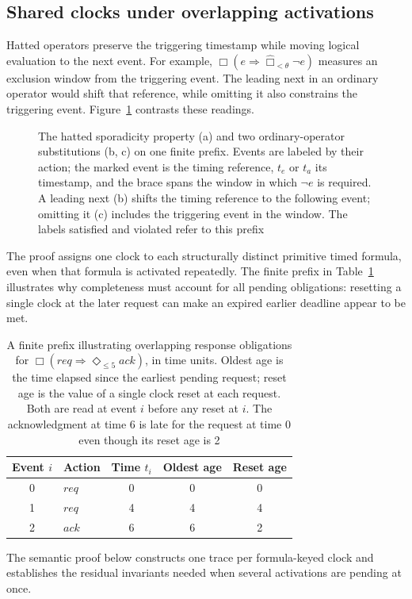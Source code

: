 \documentclass[manuscript]{acmart}
\begin{document}
\subsection{Shared clocks under overlapping activations}
\label{subsec:overlap-motivation}
Hatted operators preserve the triggering timestamp while moving logical
evaluation to the next event. For example,
$\Box(e\Rightarrow\widehat{\Box}_{<\theta}\neg e)$ measures an exclusion
window from the triggering event. The leading next in an ordinary operator
would shift that reference, while omitting it also constrains the triggering
event. Figure~\ref{fig:hat-reference} contrasts these readings.
\begin{figure}[t]
\centering
\resizebox{\textwidth}{!}{}
\caption{The hatted sporadicity property (a) and two ordinary-operator
substitutions (b, c) on one finite prefix. Events are labeled by their action;
the marked event is the timing reference, $t_e$ or $t_a$ its timestamp, and the
brace spans the window in which $\neg e$ is required. A leading next (b) shifts
the timing reference to the following event; omitting it (c) includes the
triggering event in the window. The labels satisfied and violated refer to
this prefix}
\label{fig:hat-reference}
\end{figure}

The proof assigns one clock to each structurally distinct primitive timed
formula, even when that formula is activated repeatedly. The finite prefix in
Table~\ref{tab:overlap-example} illustrates why completeness must account for
all pending obligations: resetting a single clock at the later request can
make an expired earlier deadline appear to be met.
\begin{table}[t]
\centering
\caption{A finite prefix illustrating overlapping response obligations for
$\Box(\mathit{req}\Rightarrow\Diamond_{\le5}\mathit{ack})$, in time units.
Oldest age is the time elapsed since the earliest pending request; reset age
is the value of a single clock reset at each request. Both are read at event
$i$ before any reset at $i$. The acknowledgment at time 6 is late for the
request at time 0 even though its reset age is 2}
\label{tab:overlap-example}
\begin{tabular}{@{}clccc@{}}
\toprule
Event $i$ & Action & Time $t_i$ & Oldest age & Reset age\\
\midrule
0 & $\mathit{req}$ & 0 & 0 & 0\\
1 & $\mathit{req}$ & 4 & 4 & 4\\
2 & $\mathit{ack}$ & 6 & 6 & 2\\
\bottomrule
\end{tabular}
\end{table}
The semantic proof below constructs one trace per
formula-keyed clock and establishes the residual invariants needed when
several activations are pending at once.
\end{document}
